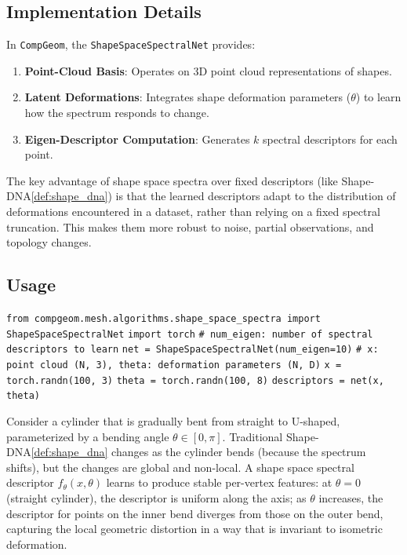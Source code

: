 \subsection{Implementation Details}
In \texttt{CompGeom}, the \texttt{ShapeSpaceSpectralNet} provides:
\begin{enumerate}
  \item \textbf{Point-Cloud Basis}: Operates on 3D point cloud representations of shapes.
  \item \textbf{Latent Deformations}: Integrates shape deformation parameters ($\theta$) to learn how the spectrum responds to change.
  \item \textbf{Eigen-Descriptor Computation}: Generates $k$ spectral descriptors for each point.
\end{enumerate}

\begin{remark}
The key advantage of shape space spectra over fixed descriptors (like Shape-DNA\cref{def:shape_dna}) is that the learned descriptors adapt to the distribution of deformations encountered in a dataset, rather than relying on a fixed spectral truncation. This makes them more robust to noise, partial observations, and topology changes.
\end{remark}

\subsection{Usage}
\begin{algorithm}
\caption{Shape Space SpectralNet Usage\label{alg:shape_space_spectralnet}}
\begin{algorithmic}[1]
\State \texttt{from compgeom.mesh.algorithms.shape\_space\_spectra import ShapeSpaceSpectralNet}
\State \texttt{import torch}
\Statex
\State \texttt{\# num\_eigen: number of spectral descriptors to learn}
\State \texttt{net = ShapeSpaceSpectralNet(num\_eigen=10)}
\Statex
\State \texttt{\# x: point cloud (N, 3), theta: deformation parameters (N, D)}
\State \texttt{x = torch.randn(100, 3)}
\State \texttt{theta = torch.randn(100, 8)}
\State \texttt{descriptors = net(x, theta)}
\end{algorithmic}
\end{algorithm}

\begin{example}\label{example:shape_space_cylinder}
Consider a cylinder that is gradually bent from straight to U-shaped, parameterized by a bending angle $\theta \in [0, \pi]$. Traditional Shape-DNA\cref{def:shape_dna} changes as the cylinder bends (because the spectrum shifts), but the changes are global and non-local. A shape space spectral descriptor $f_\theta(x, \theta)$ learns to produce stable per-vertex features: at $\theta = 0$ (straight cylinder), the descriptor is uniform along the axis; as $\theta$ increases, the descriptor for points on the inner bend diverges from those on the outer bend, capturing the local geometric distortion in a way that is invariant to isometric deformation.
\end{example}

